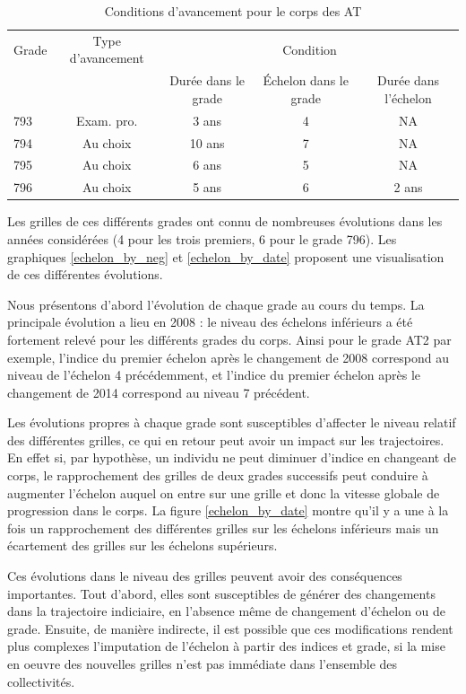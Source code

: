 \documentclass[11pt,a4paper]{article}
\begin{document}
\begin{table}[h!]
\label{means}
\centering
\caption{Conditions d'avancement pour le corps des AT} 
\begin{tabular}{l|c|ccc}
\toprule
 Grade  & Type d'avancement&  \multicolumn{3}{c}{Condition}  \\
		&  				   &  Durée dans le grade	&  Échelon	dans le grade & Durée dans l'échelon \\
\midrule
793  &	Exam. pro. 	&   3 ans  & 	4  & NA \\
794  &	Au choix 	& 	10 ans &	7  &	NA \\
795  & Au choix		& 	6 ans  &	5  &	NA \\
796 & Au choix		& 	5 ans  &	6  &	2 ans  \\	
%	
\bottomrule
\end{tabular}
\end{table}

Les grilles de ces différents grades ont connu de nombreuses évolutions dans les années considérées (4 pour les trois premiers, 6 pour le grade 796). Les graphiques \ref{echelon_by_neg} et \ref{echelon_by_date} proposent une visualisation de ces différentes évolutions. 

Nous présentons d'abord l'évolution de chaque grade au cours du temps. La principale évolution a lieu en 2008 : le niveau des échelons inférieurs a été fortement relevé pour les différents grades du corps. Ainsi pour le grade AT2 par exemple, l'indice du premier échelon après le changement de 2008 correspond au niveau de l'échelon 4 précédemment, et l'indice du premier échelon après le changement de 2014 correspond au niveau 7 précédent. 

Les évolutions propres à chaque grade sont susceptibles d'affecter le niveau relatif des différentes grilles, ce qui en retour peut avoir un impact sur les trajectoires. En effet si, par hypothèse, un individu ne peut diminuer d'indice en changeant de corps, le rapprochement des grilles de deux grades successifs peut conduire à augmenter l'échelon auquel on entre sur une grille et donc la vitesse globale de progression dans le corps. La figure \ref{echelon_by_date} montre qu'il y a une à la fois un rapprochement des différentes grilles sur les échelons inférieurs mais un écartement des grilles sur les échelons supérieurs. 

\medskip

Ces évolutions dans le niveau des grilles peuvent avoir des conséquences importantes. Tout d'abord, elles sont susceptibles de générer des changements dans la trajectoire indiciaire, en l'absence même de changement d'échelon ou de grade. Ensuite, de manière indirecte, il est possible que ces modifications rendent plus complexes l'imputation de l'échelon à partir des indices et grade, si la mise en oeuvre des nouvelles grilles n'est pas immédiate dans l'ensemble des collectivités. 
\end{document}
